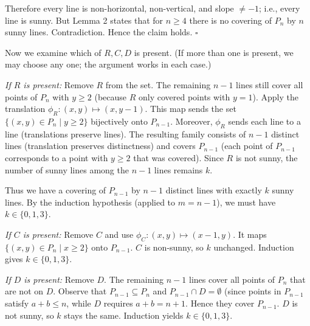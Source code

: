 Therefore every line is non-horizontal, non-vertical, and slope \(\neq -1\); i.e., every line is sunny. But Lemma 2 states that for \(n\ge 4\) there is no covering of \(P_n\) by \(n\) sunny lines. Contradiction. Hence the claim holds. \(\square\)\par
Now we examine which of \(R, C, D\) is present. (If more than one is present, we may choose any one; the argument works in each case.)\par
\emph{If \(R\) is present:} Remove \(R\) from the set. The remaining \(n-1\) lines still cover all points of \(P_n\) with \(y\ge 2\) (because \(R\) only covered points with \(y=1\)). Apply the translation \(\phi_R: (x,y) \mapsto (x, y-1)\). This map sends the set \(\{(x,y)\in P_n \mid y\ge 2\}\) bijectively onto \(P_{n-1}\). Moreover, \(\phi_R\) sends each line to a line (translations preserve lines). The resulting family consists of \(n-1\) distinct lines (translation preserves distinctness) and covers \(P_{n-1}\) (each point of \(P_{n-1}\) corresponds to a point with \(y\ge 2\) that was covered). Since \(R\) is not sunny, the number of sunny lines among the \(n-1\) lines remains \(k\).\par
Thus we have a covering of \(P_{n-1}\) by \(n-1\) distinct lines with exactly \(k\) sunny lines. By the induction hypothesis (applied to \(m=n-1\)), we must have \(k \in \{0,1,3\}\).\par
\emph{If \(C\) is present:} Remove \(C\) and use \(\phi_C: (x,y) \mapsto (x-1, y)\). It maps \(\{(x,y)\in P_n \mid x\ge 2\}\) onto \(P_{n-1}\). \(C\) is non-sunny, so \(k\) unchanged. Induction gives \(k \in \{0,1,3\}\).\par
\emph{If \(D\) is present:} Remove \(D\). The remaining \(n-1\) lines cover all points of \(P_n\) that are not on \(D\). Observe that \(P_{n-1} \subseteq P_n\) and \(P_{n-1} \cap D = \emptyset\) (since points in \(P_{n-1}\) satisfy \(a+b\le n\), while \(D\) requires \(a+b = n+1\). Hence they cover \(P_{n-1}\). \(D\) is not sunny, so \(k\) stays the same. Induction yields \(k \in \{0,1,3\}\).\par
